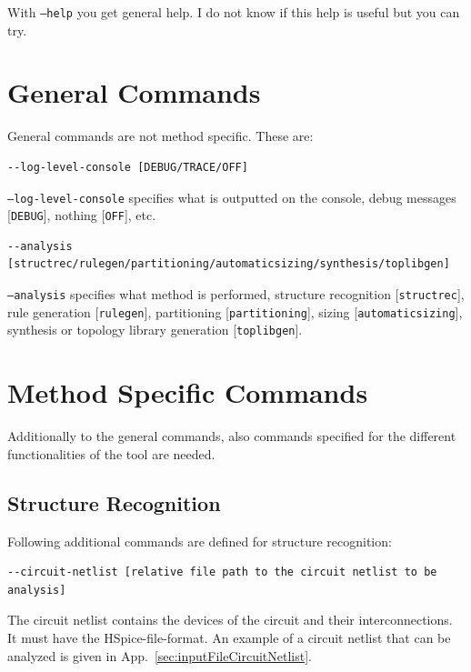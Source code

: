 With {\tt --help} you get general help. I do not know if this help is useful but you can try.

\section{General Commands}\label{sec:generalCommands}
General commands are not method specific. These are:
\begin{lstlisting}[basicstyle=\ttfamily\scriptsize,backgroundcolor={\color{gray!30}}, escapechar=? ]
--log-level-console [DEBUG/TRACE/OFF]  
\end{lstlisting}
{\tt --log-level-console} specifies what is outputted on the console, debug messages [{\tt DEBUG}], nothing [{\tt OFF}], etc.

\begin{lstlisting}[basicstyle=\ttfamily\scriptsize,backgroundcolor={\color{gray!30}}, escapechar=? ]	
--analysis [structrec/rulegen/partitioning/automaticsizing/synthesis/toplibgen]	
\end{lstlisting}
{\tt --analysis} specifies what method is performed, structure recognition [{\tt structrec}], rule generation [{\tt rulegen}], partitioning [{\tt partitioning}], sizing [{\tt automaticsizing}], synthesis \newline [{\tt synthesis}] or topology library generation [{\tt toplibgen}].

\section{Method Specific Commands}\label{sec:functionSpecificCommands}
Additionally to the general commands, also commands specified for the different functionalities of the tool are needed. 

\subsection{Structure Recognition}\label{sec:CommandsStructRec}
Following additional commands are defined for structure recognition:
\\

\begin{lstlisting}[basicstyle=\ttfamily\scriptsize,backgroundcolor={\color{gray!30}}, escapechar=? ]
--circuit-netlist [relative file path to the circuit netlist to be analysis]
\end{lstlisting}
The circuit netlist contains the devices of the circuit and their interconnections. It must have the HSpice-file-format. An example of a circuit netlist  that can be analyzed is given in App.~\ref{sec:inputFileCircuitNetlist}.
\\

